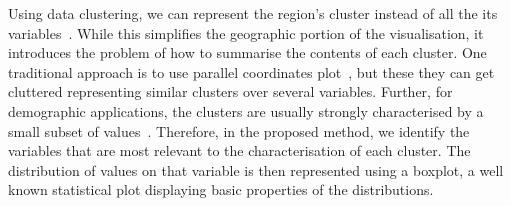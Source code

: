 Using data clustering, we can represent the region's cluster instead of all the
its variables~\citep{Alce2018,Valdivia2015,VonLandesberger2016}. While this
simplifies the geographic portion of the visualisation, it introduces the
problem of how to summarise the contents of each cluster. One traditional
approach is to use parallel coordinates plot~\citep{ferreira2015urbane}, but
these they can get cluttered representing similar clusters over several
variables. Further, for demographic applications, the clusters are usually
strongly characterised by a small subset of
values~\citep{Delmelle2016,Delmelle2017}. Therefore, in the proposed method, we
identify the variables that are most relevant to the characterisation of each
cluster. The distribution of values on that variable is then represented using a
boxplot, a well known statistical plot displaying basic properties of the
distributions.